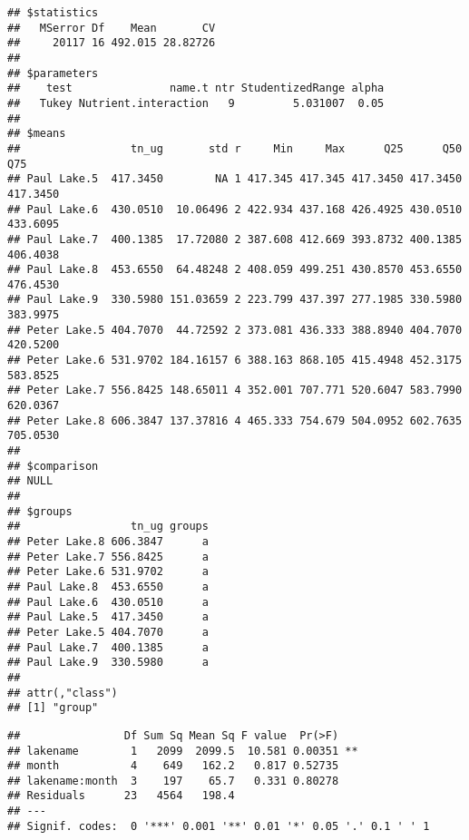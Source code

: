 \documentclass[]{article}
\newenvironment{Shaded}{\begin{snugshade}}{\end{snugshade}}
\newcommand{\CommentTok}[1]{\textcolor[rgb]{0.56,0.35,0.01}{\textit{#1}}}
\newcommand{\DataTypeTok}[1]{\textcolor[rgb]{0.13,0.29,0.53}{#1}}
\newcommand{\KeywordTok}[1]{\textcolor[rgb]{0.13,0.29,0.53}{\textbf{#1}}}
\newcommand{\NormalTok}[1]{#1}
\newcommand{\OperatorTok}[1]{\textcolor[rgb]{0.81,0.36,0.00}{\textbf{#1}}}
\newcommand{\StringTok}[1]{\textcolor[rgb]{0.31,0.60,0.02}{#1}}
\begin{document}
\begin{verbatim}
## $statistics
##   MSerror Df    Mean       CV
##     20117 16 492.015 28.82726
## 
## $parameters
##    test               name.t ntr StudentizedRange alpha
##   Tukey Nutrient.interaction   9         5.031007  0.05
## 
## $means
##                 tn_ug       std r     Min     Max      Q25      Q50      Q75
## Paul Lake.5  417.3450        NA 1 417.345 417.345 417.3450 417.3450 417.3450
## Paul Lake.6  430.0510  10.06496 2 422.934 437.168 426.4925 430.0510 433.6095
## Paul Lake.7  400.1385  17.72080 2 387.608 412.669 393.8732 400.1385 406.4038
## Paul Lake.8  453.6550  64.48248 2 408.059 499.251 430.8570 453.6550 476.4530
## Paul Lake.9  330.5980 151.03659 2 223.799 437.397 277.1985 330.5980 383.9975
## Peter Lake.5 404.7070  44.72592 2 373.081 436.333 388.8940 404.7070 420.5200
## Peter Lake.6 531.9702 184.16157 6 388.163 868.105 415.4948 452.3175 583.8525
## Peter Lake.7 556.8425 148.65011 4 352.001 707.771 520.6047 583.7990 620.0367
## Peter Lake.8 606.3847 137.37816 4 465.333 754.679 504.0952 602.7635 705.0530
## 
## $comparison
## NULL
## 
## $groups
##                 tn_ug groups
## Peter Lake.8 606.3847      a
## Peter Lake.7 556.8425      a
## Peter Lake.6 531.9702      a
## Paul Lake.8  453.6550      a
## Paul Lake.6  430.0510      a
## Paul Lake.5  417.3450      a
## Peter Lake.5 404.7070      a
## Paul Lake.7  400.1385      a
## Paul Lake.9  330.5980      a
## 
## attr(,"class")
## [1] "group"
\end{verbatim}

\begin{Shaded}
\end{Shaded}

\begin{verbatim}
##                Df Sum Sq Mean Sq F value  Pr(>F)   
## lakename        1   2099  2099.5  10.581 0.00351 **
## month           4    649   162.2   0.817 0.52735   
## lakename:month  3    197    65.7   0.331 0.80278   
## Residuals      23   4564   198.4                   
## ---
## Signif. codes:  0 '***' 0.001 '**' 0.01 '*' 0.05 '.' 0.1 ' ' 1
\end{verbatim}
\end{document}
